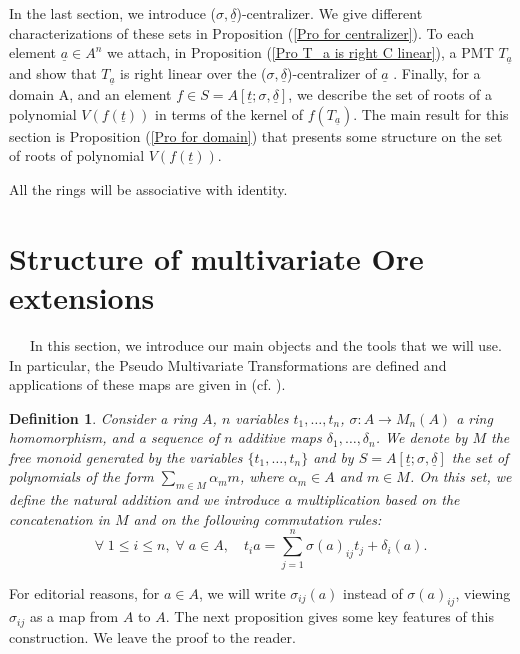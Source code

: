 \documentclass[12pt,a4paper]{article}
\newtheorem{definition}[theorem]{Definition}
\newcommand{\de}{\delta}
\newcommand{\si}{\sigma}
\newcommand{\ut}{\underline{t}}
\newcommand{\ua}{\underline{a}}
\newcommand{\ud}{\underline{\delta}}
\begin{document}
	   In the last section, we introduce ($\sigma,\ud$)-centralizer.  We give different characterizations of these sets in Proposition (\ref{Pro for centralizer}).  To each element $\ua \in A^n$ we attach, in Proposition (\ref{Pro T_a is right C linear}), a PMT $T_{\ua}$ and show that $T_{\ua} $ is right linear over the ($\sigma,\ud$)-centralizer of $\ua$ . Finally,  for a domain A, and an element  $f \in S = A[\ut; \si, \ud] $, we describe the set of roots of a polynomial $V(f(\ut))$ in terms of the kernel of $f(T_{\ua})$.  The main result for this section is Proposition (\ref{Pro for domain}) that presents some structure on the set of roots of polynomial $V(f(\ut))$.  


	All the rings will be associative with identity. 
	
	\section{Structure of multivariate Ore extensions}
	
	~~~In this section, we introduce our main objects and the tools that we will use.  In particular, the Pseudo Multivariate Transformations are defined and applications of these maps are given in (cf. \cite{MP2019}).
	
	\begin{definition}
		Consider a ring $A$, $n$ variables $t_1,\dots,t_n$, $\si: A \rightarrow M_n (A)$ a ring homomorphism, and a sequence of $n$ additive maps $\de_1,\dots,\de_n$.  We denote by 	$M$ the free monoid generated by the variables $\{t_1,\dots,t_n\}$
		and by $S=A[\ut; \si,\ud]$ the set of polynomials of the form $\sum_{m\in M}\alpha_mm$, where $\alpha_m\in A$ and $m\in M$.  On this set, we define the natural addition and we introduce a multiplication based on the concatenation in $M$ and on the following commutation rules:
		\begin{equation}
		\forall \; 1\le i \le n, \;\forall \; a\in A, \quad 
		t_ia= \sum_{j=1}^n \si(a)_{ij}t_j +\de_i(a).  
	\end{equation}
	\end{definition}
	
	For editorial reasons, for $a\in A$, we will write $\si_{ij}(a)$ instead of  $\si(a)_{ij}$, viewing $\si_{ij}$ as a map from $A$ to $A$.  The next proposition gives some key features of this construction.  We leave the proof to the reader.
	
\end{document}
